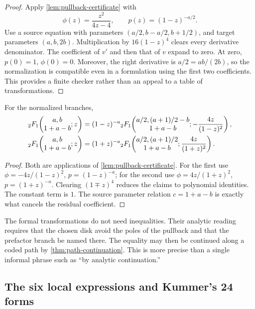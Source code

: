 \begin{proof}
Apply \cref{lem:pullback-certificate} with
\[
 \phi(z)=\frac{z^2}{4z-4},
 \qquad p(z)=(1-z)^{-a/2}.
\]
Use a source equation with parameters
\((a/2,b-a/2,b+1/2)\), and target parameters \((a,b,2b)\).
Multiplication by \(16(1-z)^4\) clears every derivative denominator.  The
coefficient of \(v'\) and then that of \(v\) expand to zero.  At zero,
\(p(0)=1\), \(\phi(0)=0\).  Moreover, the right derivative is
\(a/2=ab/(2b)\), so the normalization is compatible even in a formulation
using the first two coefficients.  This provides a finite checker rather
than an appeal to a table of transformations.
\end{proof}

\begin{theorem}\label{thm:kummer-quadratic}
For the normalized branches,
\begin{align}
 {}_2F_1\!\left(\begin{matrix}a,b\\1+a-b\end{matrix};z\right)
 &=(1-z)^{-a}
 {}_2F_1\!\left(\begin{matrix}a/2,(a+1)/2-b\\1+a-b\end{matrix};-\frac{4z}{(1-z)^2}\right),
 \label{eq:kummer-q1}\\
 {}_2F_1\!\left(\begin{matrix}a,b\\1+a-b\end{matrix};z\right)
 &=(1+z)^{-a}
 {}_2F_1\!\left(\begin{matrix}a/2,(a+1)/2\\1+a-b\end{matrix};\frac{4z}{(1+z)^2}\right).
 \label{eq:kummer-q2}
\end{align}
\end{theorem}

\begin{proof}
Both are applications of \cref{lem:pullback-certificate}.  For the first use
\(\phi=-4z/(1-z)^2\), \(p=(1-z)^{-a}\); for the second use
\(\phi=4z/(1+z)^2\), \(p=(1+z)^{-a}\).  Clearing \((1\mp z)^4\) reduces the
claims to polynomial identities.  The constant term is \(1\).  The source
parameter relation \(c=1+a-b\) is exactly what cancels the residual
coefficient.
\end{proof}

\begin{remark}
The formal transformations do not need inequalities.  Their analytic reading
requires that the chosen disk avoid the poles of the pullback and that the
prefactor branch be named there.  The equality may then be continued along a
coded path by \cref{thm:path-continuation}.  This is more precise than a
single informal phrase such as ``by analytic continuation.''
\end{remark}

\subsection{The six local expressions and Kummer's 24 forms}

